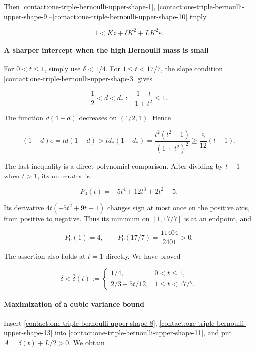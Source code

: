 Then \eqref{contact:one-triple-bernoulli-upper-shape-1}, \eqref{contact:one-triple-bernoulli-upper-shape-9}--\eqref{contact:one-triple-bernoulli-upper-shape-10} imply

\[
 1<Kz+\delta K^2+L K^2\varepsilon.
\tag{B.10.11}\label{contact:one-triple-bernoulli-upper-shape-11}
\]

\paragraph{A sharper intercept when the high Bernoulli mass is small}

For $0<t\le 1$, simply use $\delta<1/4$. For $1\le t<17/7$, the slope
condition \eqref{contact:one-triple-bernoulli-upper-shape-3} gives

\[
 \frac12<d<d_*:=\frac{1+t}{1+t^2}\leq1.
\]

The function $d(1-d)$ decreases on $(1/2,1)$. Hence

\[
 (1-d)e=t d(1-d)
 >t d_*(1-d_*)
 =\frac{t^2(t^2-1)}{(1+t^2)^2}
 \geq\frac5{12}(t-1).
\tag{B.10.12}\label{contact:one-triple-bernoulli-upper-shape-12}
\]

The last inequality is a direct polynomial comparison. After dividing
by $t-1$ when $t>1$, its numerator is

\[
 P_0(t)=-5t^4+12t^3+2t^2-5.
\]

Its derivative $4t(-5t^2+9t+1)$ changes sign at most once on the
positive axis, from positive to negative. Thus its minimum on $[1,17/7]$
is at an endpoint, and

\[
 P_0(1)=4,\qquad P_0(17/7)=\frac{11404}{2401}>0.
\]

The assertion also holds at $t=1$ directly. We have proved

\[
 \delta<\bar\delta(t):=
 \begin{cases}
  1/4,&0<t\leq1,\\
  2/3-5t/12,&1\leq t<17/7.
 \end{cases}
\tag{B.10.13}\label{contact:one-triple-bernoulli-upper-shape-13}
\]

\paragraph{Maximization of a cubic variance bound}

Insert \eqref{contact:one-triple-bernoulli-upper-shape-8}, \eqref{contact:one-triple-bernoulli-upper-shape-13} into \eqref{contact:one-triple-bernoulli-upper-shape-11}, and put
$A=\bar\delta(t)+L/2>0$. We obtain

